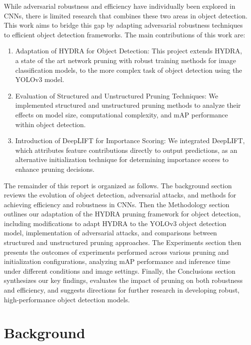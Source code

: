 \documentclass[journal,onecolumn,12pt]{IEEEtran}
\begin{document}
While adversarial robustness and efficiency have individually been explored in CNNs, there is limited research that combines these two areas in object detection. This work aims to bridge this gap by adapting adversarial robustness techniques to efficient object detection frameworks. The main contributions of this work are:

\begin{enumerate}
    \item Adaptation of HYDRA for Object Detection: This project extends HYDRA, a state of the art network pruning with robust training methods for image classification models, to the more complex task of object detection using the YOLOv3 model.
    \item Evaluation of Structured and Unstructured Pruning Techniques: We implemented structured and unstructured pruning methods to analyze their effects on model size, computational complexity, and mAP \cite{iou} performance within object detection.
    \item Introduction of DeepLIFT for Importance Scoring: We integrated DeepLIFT, which attributes feature contributions directly to output predictions, as an alternative initialization technique for determining importance scores to enhance pruning decisions.
\end{enumerate}

The remainder of this report is organized as follows. The background section reviews the evolution of object detection, adversarial attacks, and methods for achieving efficiency and robustness in CNNs. Then the Methodology section outlines our adaptation of the HYDRA pruning framework for object detection, including modifications to adapt HYDRA to the YOLOv3 object detection model, implementation of adversarial attacks, and comparisons between structured and unstructured pruning approaches. The Experiments section then presents the outcomes of experiments performed across various pruning and initialization configurations, analyzing mAP performance and inference time under different conditions and image settings. Finally, the Conclusions section synthesizes our key findings, evaluates the impact of pruning on both robustness and efficiency, and suggests directions for further research in developing robust, high-performance object detection models.

\section{Background}
\end{document}
